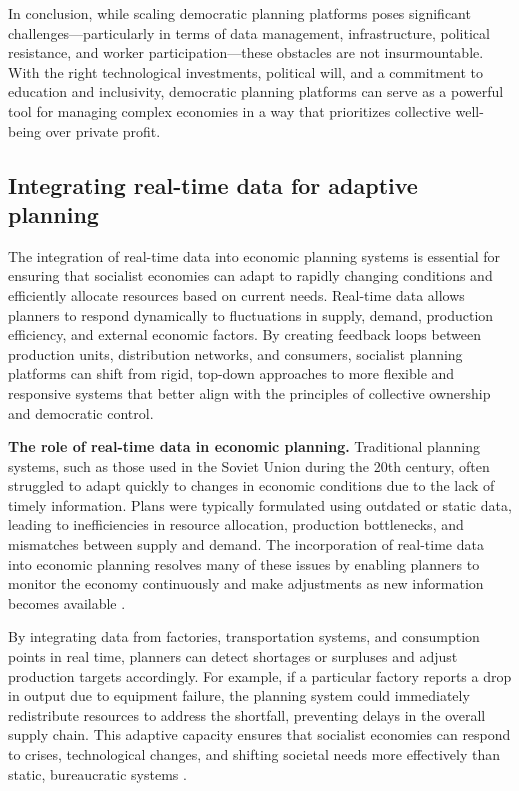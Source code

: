 \begin{refsection}
\medskip

In conclusion, while scaling democratic planning platforms poses significant challenges—particularly in terms of data management, infrastructure, political resistance, and worker participation—these obstacles are not insurmountable. With the right technological investments, political will, and a commitment to education and inclusivity, democratic planning platforms can serve as a powerful tool for managing complex economies in a way that prioritizes collective well-being over private profit.

\subsection{Integrating real-time data for adaptive planning}

The integration of real-time data into economic planning systems is essential for ensuring that socialist economies can adapt to rapidly changing conditions and efficiently allocate resources based on current needs. Real-time data allows planners to respond dynamically to fluctuations in supply, demand, production efficiency, and external economic factors. By creating feedback loops between production units, distribution networks, and consumers, socialist planning platforms can shift from rigid, top-down approaches to more flexible and responsive systems that better align with the principles of collective ownership and democratic control.

\textbf{The role of real-time data in economic planning.} Traditional planning systems, such as those used in the Soviet Union during the 20th century, often struggled to adapt quickly to changes in economic conditions due to the lack of timely information. Plans were typically formulated using outdated or static data, leading to inefficiencies in resource allocation, production bottlenecks, and mismatches between supply and demand. The incorporation of real-time data into economic planning resolves many of these issues by enabling planners to monitor the economy continuously and make adjustments as new information becomes available \cite[pp.~15]{medina2014cybersyn}.

By integrating data from factories, transportation systems, and consumption points in real time, planners can detect shortages or surpluses and adjust production targets accordingly. For example, if a particular factory reports a drop in output due to equipment failure, the planning system could immediately redistribute resources to address the shortfall, preventing delays in the overall supply chain. This adaptive capacity ensures that socialist economies can respond to crises, technological changes, and shifting societal needs more effectively than static, bureaucratic systems \cite[pp.~92]{cockshott1993towards}.


\end{refsection}
